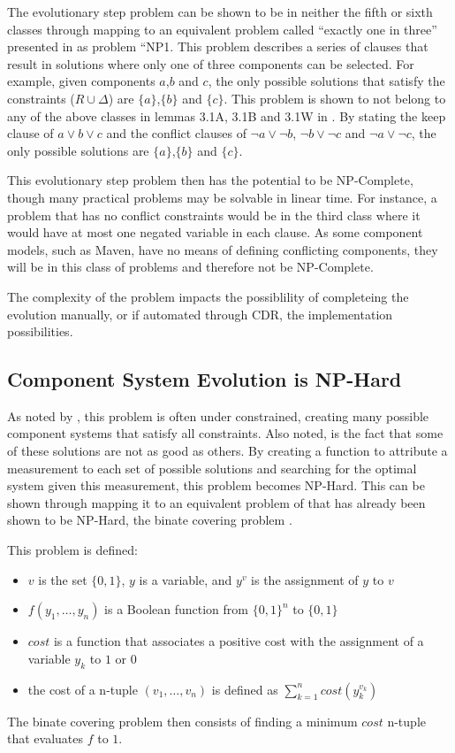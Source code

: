 The evolutionary step problem can be shown to be in neither the fifth or sixth classes 
through mapping to an equivalent problem called ``exactly one in three'' presented in \cite{Schaefer1978} as problem ``NP1.
This problem describes a series of clauses that result in solutions where only one of three components can be selected. 
For example, given components $a$,$b$ and $c$, the only possible solutions that satisfy the constraints ($R \cup \Delta$) are $\{a\}$,$\{b\}$ and $\{c\}$.
This problem is shown to not belong to any of the above classes in lemmas 3.1A, 3.1B and 3.1W in \cite{Schaefer1978}.
By stating the keep clause of $a \vee b \vee c$ and the conflict clauses of $\neg a \vee \neg b$, $\neg b \vee \neg c$ and $\neg a \vee \neg c$, 
the only possible solutions are $\{a\}$,$\{b\}$ and $\{c\}$. 

This evolutionary step problem then has the potential to be NP-Complete, though many practical problems may be solvable in linear time.
For instance, a problem that has no conflict constraints would be in the third class where it would have at most one negated variable in each clause.
As some component models, such as Maven, have no means of defining conflicting components, they will be in this class of problems and therefore not be NP-Complete. 

The complexity of the problem impacts the possiblility of completeing the evolution manually, or if automated through CDR, the implementation possibilities.

\subsection{Component System Evolution is NP-Hard}
As noted by \cite{leberre2008}, this problem is often under constrained, creating many possible component systems that satisfy all constraints.
Also noted, is the fact that some of these solutions are not as good as others.
By creating a function to attribute a measurement to each set of possible solutions and searching for the optimal system given this measurement, this problem becomes NP-Hard. 
This can be shown through mapping it to an equivalent problem of that has already been shown to be NP-Hard, the binate covering problem \cite{Coudert1996}.

This problem is defined:
\begin{itemize}
  \item $v$ is the set $\{0,1\}$, $y$ is a variable, and $y^v$ is the assignment of $y$ to $v$
  \item $f(y_1, \ldots, y_n)$ is a Boolean function from $\{0,1\}^n$ to $\{0,1\}$
  \item $cost$ is a function that associates a positive cost with the assignment of a variable $y_k$ to $1$ or $0$
  \item the cost of a n-tuple $(v_1,\ldots,v_n)$ is defined as $\sum^n_{k=1}cost(y^{v_k}_{k})$
\end{itemize}
The binate covering problem then consists of finding a minimum $cost$ n-tuple that evaluates $f$ to $1$.

